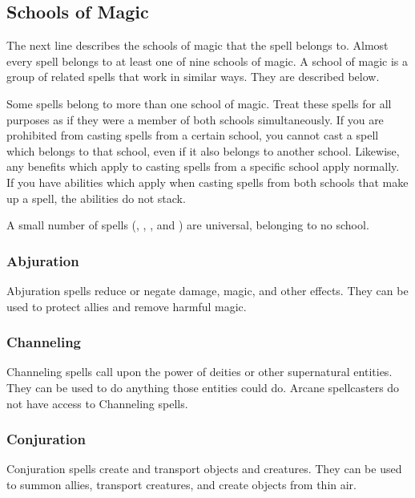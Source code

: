     \subsection{Schools of Magic}\label{Schools of Magic}
        The next line describes the schools of magic that the spell belongs to.
        Almost every spell belongs to at least one of nine schools of magic.
        A school of magic is a group of related spells that work in similar ways.
        They are described below.

        Some spells belong to more than one school of magic.
        Treat these spells for all purposes as if they were a member of both schools simultaneously.
        If you are prohibited from casting spells from a certain school, you cannot cast a spell which belongs to that school, even if it also belongs to another school.
        Likewise, any benefits which apply to casting spells from a specific school apply normally.
        If you have abilities which apply when casting spells from both schools that make up a spell, the abilities do not stack.

        A small number of spells (, , , and ) are universal, belonging to no school.

        \subsubsection{Abjuration}
            Abjuration spells reduce or negate damage, magic, and other effects.
            They can be used to protect allies and remove harmful magic.

        \subsubsection{Channeling}
            Channeling spells call upon the power of deities or other supernatural entities.
            They can be used to do anything those entities could do.
            Arcane spellcasters do not have access to Channeling spells.

        \subsubsection{Conjuration}
            Conjuration spells create and transport objects and creatures.
            They can be used to summon allies, transport creatures, and create objects from thin air.


